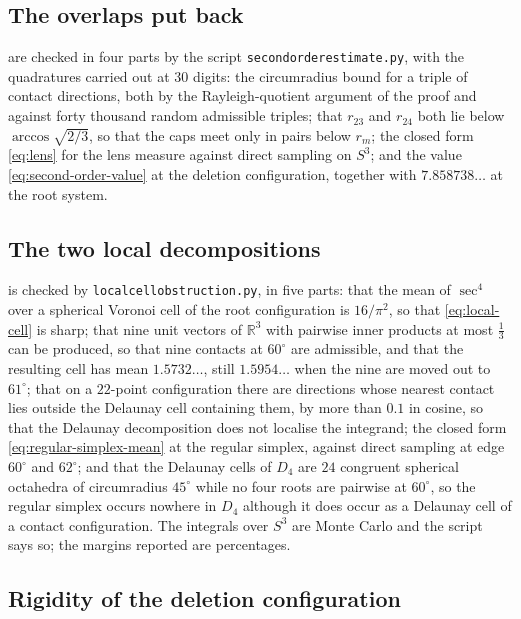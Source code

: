 \documentclass[11pt,reqno]{amsart}
\renewcommand{\_}{\origunderscore\allowbreak}
\numberwithin{equation}{section}
\theoremstyle{plain}
\theoremstyle{definition}
\theoremstyle{remark}
\begin{document}
\subsection*{The overlaps put back}

 are checked in four parts by the
script \texttt{second\_order\_estimate.py}, with the quadratures
carried out at $30$ digits: the circumradius bound for a triple of
contact directions, both by the Rayleigh-quotient argument of the proof
and against forty thousand random admissible triples; that $r_{23}$ and
$r_{24}$ both lie below $\arccos\sqrt{2/3}$, so that the caps meet only
in pairs below $r_m$; the closed form \eqref{eq:lens} for the lens
measure against direct sampling on $S^3$; and the value
\eqref{eq:second-order-value} at the deletion configuration, together
with $7.858738\ldots$ at the root system.

\subsection*{The two local decompositions}

 is checked by
\texttt{local\_cell\_obstruction.py}, in five parts: that the mean of
$\sec^4$ over a spherical Voronoi cell of the root configuration is
$16/\pi^2$, so that \eqref{eq:local-cell} is sharp; that nine unit
vectors of $\mathbb{R}^3$ with pairwise inner products at most
$\tfrac13$ can be produced, so that nine contacts at $60^\circ$ are
admissible, and that the resulting cell has mean $1.5732\ldots$, still
$1.5954\ldots$ when the nine are moved out to $61^\circ$; that on a
$22$-point configuration there are directions whose nearest contact lies
outside the Delaunay cell containing them, by more than $0.1$ in cosine,
so that the Delaunay decomposition does not localise the integrand;
the closed form \eqref{eq:regular-simplex-mean} at the regular simplex,
against direct sampling at edge $60^\circ$ and $62^\circ$; and that the
Delaunay cells of $D_4$ are $24$ congruent spherical octahedra of
circumradius $45^\circ$ while no four roots are pairwise at $60^\circ$,
so the regular simplex occurs nowhere in $D_4$ although it does occur as
a Delaunay cell of a contact configuration. The integrals over $S^3$ are
Monte Carlo and the script says so; the margins reported are
percentages.

\subsection*{Rigidity of the deletion configuration}
\end{document}
